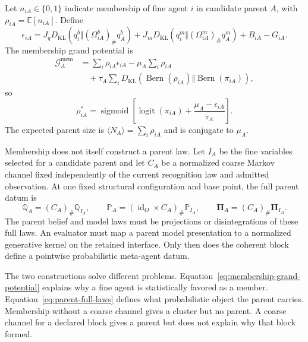 \documentclass[11pt,letterpaper]{article}
\newcommand{\KL}{D_{\mathrm{KL}}}
\newcommand{\E}{\mathbb E}
\newcommand{\cG}{\mathcal G}
\newcommand{\push}{_{\#}}
\newcommand{\Bern}{\operatorname{Bern}}
\newcommand{\logit}{\operatorname{logit}}
\newcommand{\sigmoid}{\operatorname{sigmoid}}
\begin{document}
Let $n_{iA}\in\{0,1\}$ indicate membership of fine agent $i$ in candidate parent $A$, with $\rho_{iA}=\E[n_{iA}]$.  Define
\begin{equation}
 \epsilon_{iA}
 =J_q\KL\left(q_i^b\Vert(\Omega_{iA}^b)\push q_A^b\right)
 +J_m\KL\left(q_i^m\Vert(\Omega_{iA}^m)\push q_A^m\right)
 +B_{iA}-G_{iA}.
 \label{eq:membership-energy}
\end{equation}
The membership grand potential is
\begin{align}
 \cG_A^{\mathrm{mem}}
 &=\sum_i\rho_{iA}\epsilon_{iA}
 -\mu_A\sum_i\rho_{iA}
 \nonumber\\
 &\quad+\tau_A\sum_i
 \KL\left(\Bern(\rho_{iA})\Vert\Bern(\pi_{iA})\right),
 \label{eq:membership-grand-potential}
\end{align}
so
\begin{equation}
 \rho_{iA}^*
 =\sigmoid\left[
 \logit(\pi_{iA})+\frac{\mu_A-\epsilon_{iA}}{\tau_A}
 \right].
 \label{eq:membership-probability}
\end{equation}
The expected parent size is $\langle N_A\rangle=\sum_i\rho_{iA}$ and is conjugate to $\mu_A$.

Membership does not itself construct a parent law.  Let $I_A$ be the fine variables selected for a candidate parent and let $C_A$ be a normalized coarse Markov channel fixed independently of the current recognition law and admitted observation.  At one fixed structural configuration and base point, the full parent datum is
\begin{equation}
 \boxed{
 \mathbb Q_A=(C_A)\push\mathbb Q_{I_A},
 \qquad
 \mathbb P_A=(\operatorname{id}_{O}\times C_A)\push\mathbb P_{I_A},
 \qquad
 \boldsymbol\Pi_A=(C_A)\push\boldsymbol\Pi_{I_A}.}
 \label{eq:parent-full-laws}
\end{equation}
The parent belief and model laws must be projections or disintegrations of these full laws.  An evaluator must map a parent model presentation to a normalized generative kernel on the retained interface.  Only then does the coherent block define a pointwise probabilistic meta-agent datum.

The two constructions solve different problems.  Equation~\eqref{eq:membership-grand-potential} explains why a fine agent is statistically favored as a member.  Equation~\eqref{eq:parent-full-laws} defines what probabilistic object the parent carries.  Membership without a coarse channel gives a cluster but no parent.  A coarse channel for a declared block gives a parent but does not explain why that block formed.
\end{document}
